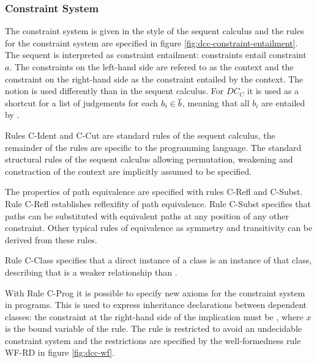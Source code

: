 \subsubsection{Constraint System}
The constraint system is given in the style of the sequent calculus
and the rules for the constraint system are specified in figure \ref{fig:dcc-constraint-entailment}.
The sequent  is interpreted as constraint entailment:
constraints  entail constraint $a$.
The constraints on the left-hand side are refered to as the context
and the constraint on the right-hand side as the constraint entailed by the context.
The notion  is used differently than in the sequent calculus.
For $DC_C$ it is used as a shortcut for a list of judgements
 for each $b_i \in \overline{b}$,
meaning that all $b_i$ are entailed by .

Rules C-Ident and C-Cut are standard rules of the sequent calculus,
the remainder of the rules are specific to the programming language.
The standard structural rules of the sequent calculus allowing
permutation, weakening and constraction of the context
are implicitly assumed to be specified.

The properties of path equivalence are specified with rules C-Refl and C-Subst.
Rule C-Refl establishes reflexifity of path equivalence.
Rule C-Subst specifies that paths can be substituted with equivalent paths
at any position of any other constraint.
Other typical rules of equivalence as symmetry and transitivity can be
derived from these rules.

Rule C-Class specifies that a direct instance of a class
is an instance of that class, describing that
 is a weaker relationship than .

With Rule C-Prog it is possible to specify new axioms for the constraint system in programs.
This is used to express inheritance declarations between dependent classes:
the constraint at the right-hand side of the implication must be ,
where $x$ is the bound variable of the rule.
The rule is restricted to avoid an undecidable constraint system
and the restrictions are specified by the well-formedness rule WF-RD in figure \ref{fig:dcc-wf}.


